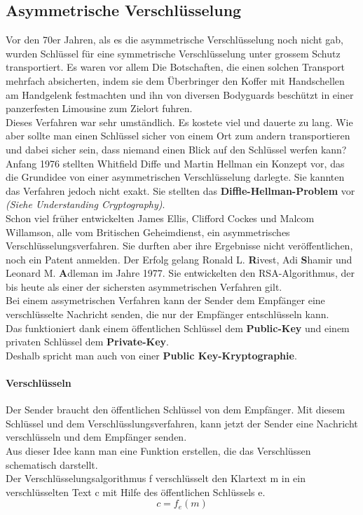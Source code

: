 \subsection{Asymmetrische Verschlüsselung}
Vor den 70er Jahren, als es die asymmetrische Verschlüsselung noch nicht gab, wurden Schlüssel für eine symmetrische Verschlüsselung unter grossem Schutz transportiert.
%
Es waren vor allem Die Botschaften, die einen solchen Transport mehrfach absicherten, indem sie dem Überbringer den Koffer mit Handschellen am Handgelenk festmachten und ihn von diversen Bodyguards beschützt in einer panzerfesten Limousine zum Zielort fuhren.\\
Dieses Verfahren war sehr umständlich. Es kostete viel und dauerte zu lang. Wie aber sollte man einen Schlüssel sicher von einem Ort zum andern transportieren und dabei sicher sein, dass niemand einen Blick auf den Schlüssel werfen kann?\\
%
Anfang 1976 stellten Whitfield Diffe und Martin Hellman ein Konzept vor, das die Grundidee von einer asymmetrischen Verschlüsselung darlegte. Sie kannten das Verfahren jedoch nicht exakt. Sie stellten das \textbf{Diffle-Hellman-Problem} vor \textit{(Siehe Understanding Cryptography)}.\\ %
Schon viel früher entwickelten James Ellis, Clifford Cockes und Malcom Willamson, alle vom Britischen Geheimdienst, ein asymmetrisches Verschlüsselungsverfahren. Sie durften aber ihre Ergebnisse nicht veröffentlichen, noch ein Patent anmelden. 
Der Erfolg gelang Ronald L. \textbf{R}ivest, Adi \textbf{S}hamir und Leonard M. \textbf{A}dleman im Jahre 1977. Sie entwickelten den RSA-Algorithmus, der bis heute als einer der sichersten asymmetrischen Verfahren gilt.\\[2ex]
%
Bei einem assymetrischen Verfahren kann der Sender dem Empfänger eine verschlüsselte Nachricht senden, die nur der Empfänger entschlüsseln kann.\\
%
Das funktioniert dank einem öffentlichen Schlüssel dem \textbf{Public-Key} und einem privaten Schlüssel dem \textbf{Private-Key}. \\
Deshalb spricht man auch von einer \textbf{Public Key-Kryptographie}.
%
\paragraph{Verschlüsseln} Der Sender braucht den öffentlichen Schlüssel von dem Empfänger. Mit diesem Schlüssel und dem Verschlüsslungsverfahren, kann jetzt der Sender eine Nachricht verschlüsseln und dem Empfänger senden.\\
Aus dieser Idee kann man eine Funktion erstellen, die das Verschlüssen schematisch darstellt.\\
Der Verschlüsselungsalgorithmus f verschlüsselt den Klartext m in ein verschlüsselten Text c mit Hilfe des öffentlichen Schlüssels e.
\begin{equation*}
  c = f_e (m)
  \label{eqn:asy_versch}
\end{equation*}
